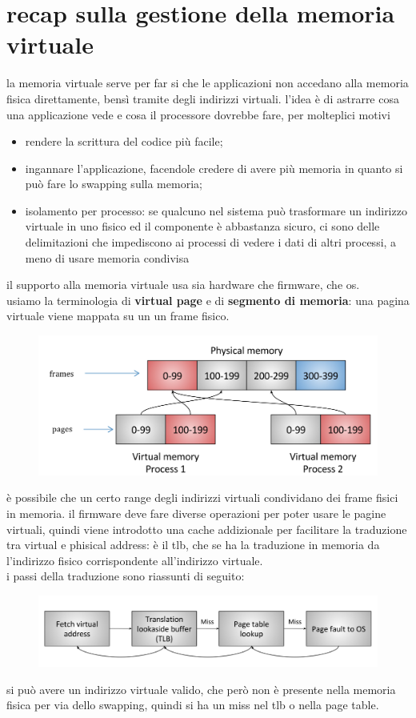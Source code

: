 \documentclass[12pt, oneside]{extbook} %
\begin{document}
\section{recap sulla gestione della memoria virtuale}
la memoria virtuale serve per far si che le applicazioni non accedano alla memoria fisica direttamente, bensì tramite degli indirizzi virtuali. l'idea è di astrarre cosa una applicazione vede e cosa il processore dovrebbe fare, per molteplici motivi
\begin{itemize}
\item rendere la scrittura del codice più facile;
\item ingannare l'applicazione, facendole credere di avere più memoria in quanto si può fare lo swapping sulla memoria;
\item isolamento per processo: se qualcuno nel sistema può trasformare un indirizzo virtuale in uno fisico ed il componente è abbastanza sicuro, ci sono delle delimitazioni che impediscono ai processi di vedere i dati di altri processi, a meno di usare memoria condivisa
\end{itemize}
il supporto alla memoria virtuale usa sia hardware che firmware, che os.\\ usiamo la terminologia di \textbf{virtual page} e di \textbf{segmento di memoria}: una pagina virtuale viene mappata su un un frame fisico.
\begin{figure}[!h]
	\includegraphics[scale=0.3]{immagini/frame_pages_mapping.png}
\end{figure}
è possibile che un certo range degli indirizzi virtuali condividano dei frame fisici in memoria. il firmware deve fare diverse operazioni per poter usare le pagine virtuali, quindi viene introdotto una cache addizionale per facilitare la traduzione tra virtual e phisical address: è il tlb, che se ha la traduzione in memoria da l'indirizzo fisico corrispondente all'indirizzo virtuale.\\ i passi della traduzione sono riassunti di seguito:
\begin{figure}[!h]
	\includegraphics[scale=0.3]{immagini/virt_to_phis.png}
\end{figure}
si può avere un indirizzo virtuale valido, che però non è presente nella memoria fisica per via dello swapping, quindi si ha un miss nel tlb o nella page table.
\end{document}
